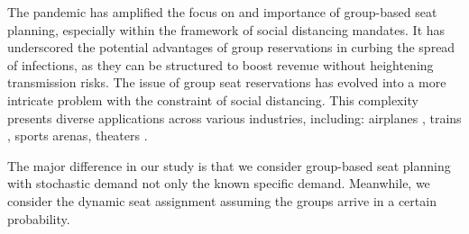 
The pandemic has amplified the focus on and importance of group-based seat planning, especially within the framework of social distancing mandates. It has underscored the potential advantages of group reservations in curbing the spread of infections, as they can be structured to boost revenue without heightening transmission risks. The issue of group seat reservations has evolved into a more intricate problem with the constraint of social distancing. This complexity presents diverse applications across various industries, including: airplanes \cite{salari2022social}, trains \cite{haque2023social}, sports arenas\cite{kwag2022optimal}, theaters \cite{blom2022filling}.

The major difference in our study is that we consider group-based seat planning with stochastic demand not only the known specific demand. Meanwhile, we consider the dynamic seat assignment assuming the groups arrive in a certain probability.





